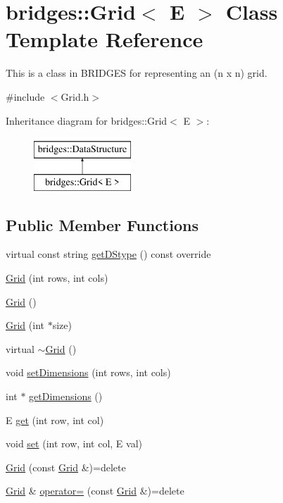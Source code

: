 \hypertarget{classbridges_1_1_grid}{}\section{bridges\+:\+:Grid$<$ E $>$ Class Template Reference}
\label{classbridges_1_1_grid}


This is a class in B\+R\+I\+D\+G\+ES for representing an (n x n) grid.  




{\ttfamily \#include $<$Grid.\+h$>$}

Inheritance diagram for bridges\+:\+:Grid$<$ E $>$\+:\begin{figure}[H]
\begin{center}
\leavevmode
\includegraphics[height=2.000000cm]{classbridges_1_1_grid}
\end{center}
\end{figure}
\subsection*{Public Member Functions}
\begin{DoxyCompactItemize}
\item 
virtual const string \mbox{\hyperlink{classbridges_1_1_grid_ab701d081de4f7ffafb15966758dd5446}{get\+D\+Stype}} () const override
\item 
\mbox{\hyperlink{classbridges_1_1_grid_af8bb9244c4c713f2325af6d4754ad1e9}{Grid}} (int rows, int cols)
\item 
\mbox{\hyperlink{classbridges_1_1_grid_a711e05a933c2a11c9e2775c74e6cf80d}{Grid}} ()
\item 
\mbox{\hyperlink{classbridges_1_1_grid_ad5c6c5e87eb40446ac794c5479937f87}{Grid}} (int $\ast$size)
\item 
virtual \mbox{\hyperlink{classbridges_1_1_grid_a46cc94397ea38211349b10e3629b2590}{$\sim$\+Grid}} ()
\item 
void \mbox{\hyperlink{classbridges_1_1_grid_a8e5e4d92097f9d1481a14219eb5cc5a8}{set\+Dimensions}} (int rows, int cols)
\item 
int $\ast$ \mbox{\hyperlink{classbridges_1_1_grid_ad21e4fc94483ef822fda9b74a52b9f48}{get\+Dimensions}} ()
\item 
E \mbox{\hyperlink{classbridges_1_1_grid_aab69e77d9e1a51eabcf29c9c229cd35f}{get}} (int row, int col)
\item 
void \mbox{\hyperlink{classbridges_1_1_grid_acd750e5886349488257aba85f0b06f6f}{set}} (int row, int col, E val)
\item 
\mbox{\hyperlink{classbridges_1_1_grid_af3b18d3a6b302c200154e869337cc85b}{Grid}} (const \mbox{\hyperlink{classbridges_1_1_grid}{Grid}} \&)=delete
\item 
\mbox{\hyperlink{classbridges_1_1_grid}{Grid}} \& \mbox{\hyperlink{classbridges_1_1_grid_ab79fc10a9ebd55dd3565ca1ea6933b13}{operator=}} (const \mbox{\hyperlink{classbridges_1_1_grid}{Grid}} \&)=delete
\end{DoxyCompactItemize}
